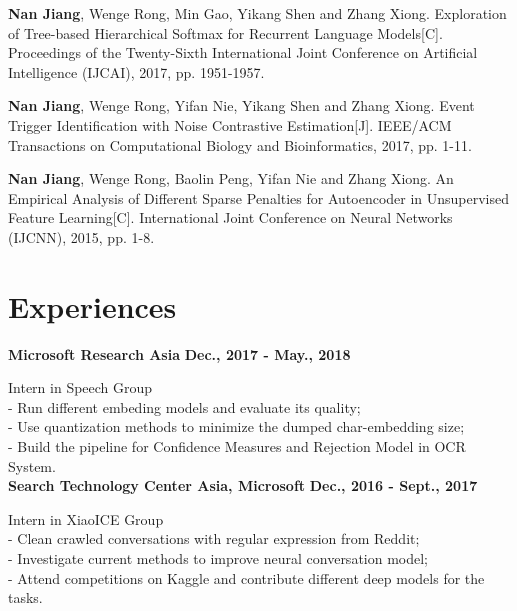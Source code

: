 \documentclass[margin,line]{resume}
\begin{document}
\begin{resume}
\textbf{Nan Jiang}, Wenge Rong, Min Gao, Yikang Shen and Zhang Xiong. Exploration of Tree-based Hierarchical Softmax for Recurrent Language Models[C]. Proceedings of the Twenty-Sixth International Joint Conference on Artificial Intelligence (IJCAI), 2017, pp. 1951-1957.

\textbf{Nan Jiang}, Wenge Rong, Yifan Nie, Yikang Shen and Zhang Xiong. Event Trigger Identification with Noise Contrastive Estimation[J]. IEEE/ACM Transactions on Computational Biology and Bioinformatics, 2017, pp. 1-11.


\textbf{Nan Jiang}, Wenge Rong, Baolin Peng, Yifan Nie and Zhang Xiong. An Empirical Analysis of Different Sparse Penalties
for Autoencoder in Unsupervised Feature Learning[C]. International Joint Conference on Neural Networks (IJCNN), 2015, pp. 1-8.




\section{Experiences}
{\bf Microsoft Research Asia} \hfill {\bf Dec., 2017 - May., 2018}

{Intern in Speech Group} \\
- Run different embeding models and evaluate its quality; \\
- Use quantization methods to minimize the dumped char-embedding size; \\
- Build the pipeline for Confidence Measures and Rejection Model in OCR System. \\



{\bf Search Technology Center Asia, Microsoft} \hfill {\bf Dec., 2016 - Sept., 2017}

{Intern in XiaoICE Group} \\
- Clean crawled conversations with regular expression from Reddit;\\
- Investigate current methods to improve neural conversation model;\\
- Attend competitions on Kaggle and contribute different deep models for the tasks.




%



\end{resume}
\end{document}

